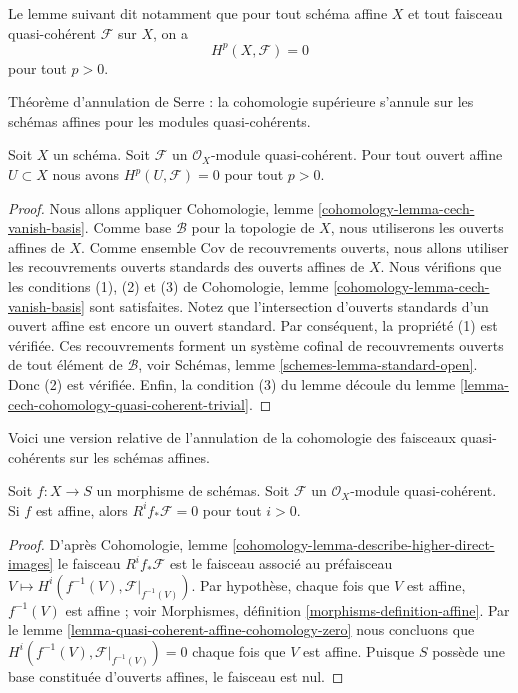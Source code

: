 \noindent
Le lemme suivant dit notamment que pour tout schéma affine
$X$ et tout faisceau quasi-cohérent $\mathcal{F}$ sur $X$, on a
$$
H^p(X, \mathcal{F}) = 0
$$
pour tout $p > 0$.

\begin{lemma}
\label{lemma-quasi-coherent-affine-cohomology-zero}
\begin{slogan}
Théorème d'annulation de Serre : la cohomologie supérieure s'annule sur les schémas
affines pour les modules quasi-cohérents.
\end{slogan}
Soit $X$ un schéma.
Soit $\mathcal{F}$ un $\mathcal{O}_X$-module
quasi-cohérent. Pour tout ouvert affine $U \subset X$ nous avons
$H^p(U, \mathcal{F}) = 0$ pour tout $p > 0$.
\end{lemma}

\begin{proof}
Nous allons appliquer Cohomologie,
lemme \ref{cohomology-lemma-cech-vanish-basis}.
Comme base $\mathcal{B}$ pour la topologie de $X$, nous utiliserons les
ouverts affines de $X$.
Comme ensemble $\text{Cov}$ de recouvrements ouverts, nous allons utiliser les recouvrements ouverts
standards des ouverts affines de $X$.
Nous vérifions que les conditions (1), (2) et (3) de
Cohomologie, lemme \ref{cohomology-lemma-cech-vanish-basis}
sont satisfaites. Notez que l'intersection d'ouverts standards d'un ouvert affine est encore un
ouvert standard. Par conséquent, la propriété (1) est
vérifiée. Ces recouvrements forment un système cofinal de recouvrements ouverts de tout élément
de $\mathcal{B}$, voir
Schémas, lemme \ref{schemes-lemma-standard-open}.
Donc (2) est
vérifiée. Enfin, la condition (3) du lemme découle du
lemme \ref{lemma-cech-cohomology-quasi-coherent-trivial}.
\end{proof}

\noindent
Voici une version relative de l'annulation de la cohomologie des faisceaux quasi-cohérents sur
les schémas affines.

\begin{lemma}
\label{lemma-relative-affine-vanishing}
Soit $f : X \to S$ un morphisme de schémas.
Soit $\mathcal{F}$ un $\mathcal{O}_X$-module quasi-cohérent.
Si $f$ est affine, alors $R^if_*\mathcal{F} = 0$ pour tout $i > 0$.
\end{lemma}

\begin{proof}
D'après Cohomologie,
lemme \ref{cohomology-lemma-describe-higher-direct-images}
le faisceau
$R^if_*\mathcal{F}$ est le faisceau associé au préfaisceau
$V \mapsto H^i(f^{-1}(V), \mathcal{F}|_{f^{-1}(V)})$. Par
hypothèse, chaque fois que $V$ est affine, $f^{-1}(V)$ est
affine ; voir Morphismes, définition \ref{morphisms-definition-affine}.
Par le lemme \ref{lemma-quasi-coherent-affine-cohomology-zero} nous concluons que
$H^i(f^{-1}(V), \mathcal{F}|_{f^{-1}(V)}) = 0$
chaque fois que $V$ est affine. Puisque $S$ possède une base constituée d'ouverts affines, le
faisceau est nul.
\end{proof}

